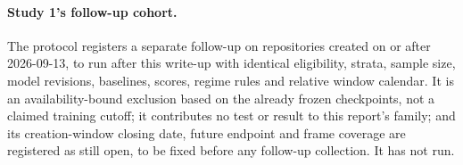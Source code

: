 \paragraph{Study 1's follow-up cohort.} The protocol registers a separate follow-up on repositories created
on or after 2026-09-13, to run after this write-up with identical eligibility, strata, sample size, model
revisions, baselines, scores, regime rules and relative window calendar. It is an availability-bound
exclusion based on the already frozen checkpoints, not a claimed training cutoff; it contributes no test or
result to this report's family; and its creation-window closing date, future endpoint and frame coverage are
registered as still open, to be fixed before any follow-up collection. It has not run.
